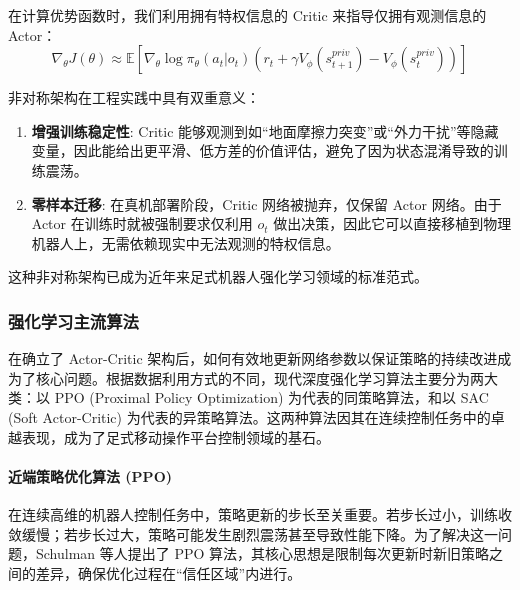 在计算优势函数时，我们利用拥有特权信息的 Critic 来指导仅拥有观测信息的 Actor：
\begin{equation}
    \nabla_\theta J(\theta) \approx \mathbb{E} \left[ \nabla_\theta \log \pi_\theta(a_t | o_t) \left( r_t + \gamma V_\phi(s_{t+1}^{priv}) - V_\phi(s_t^{priv}) \right) \right]
\end{equation}

非对称架构在工程实践中具有双重意义：
\begin{enumerate}
    \item \textbf{增强训练稳定性}: Critic 能够观测到如“地面摩擦力突变”或“外力干扰”等隐藏变量，因此能给出更平滑、低方差的价值评估，避免了因为状态混淆导致的训练震荡。
    \item \textbf{零样本迁移}: 在真机部署阶段，Critic 网络被抛弃，仅保留 Actor 网络。由于 Actor 在训练时就被强制要求仅利用 $o_t$ 做出决策，因此它可以直接移植到物理机器人上，无需依赖现实中无法观测的特权信息。
\end{enumerate}

这种非对称架构已成为近年来足式机器人强化学习领域的标准范式。

\subsubsection{强化学习主流算法}
在确立了 Actor-Critic 架构后，如何有效地更新网络参数以保证策略的持续改进成为了核心问题。根据数据利用方式的不同，现代深度强化学习算法主要分为两大类：以 PPO (Proximal Policy Optimization) \cite{schulman2017proximalpolicyoptimizationalgorithms}为代表的同策略算法，和以 SAC (Soft Actor-Critic) \cite{haarnoja2017reinforcementlearningdeepenergybased, haarnoja2018softactorcriticoffpolicymaximum, haarnoja2019softactorcriticalgorithmsapplications} 为代表的异策略算法。这两种算法因其在连续控制任务中的卓越表现，成为了足式移动操作平台控制领域的基石。

\paragraph{近端策略优化算法 (PPO)}

在连续高维的机器人控制任务中，策略更新的步长至关重要。若步长过小，训练收敛缓慢；若步长过大，策略可能发生剧烈震荡甚至导致性能下降。为了解决这一问题，Schulman 等人提出了 PPO 算法\cite{schulman2017proximalpolicyoptimizationalgorithms}，其核心思想是限制每次更新时新旧策略之间的差异，确保优化过程在“信任区域”内进行。


